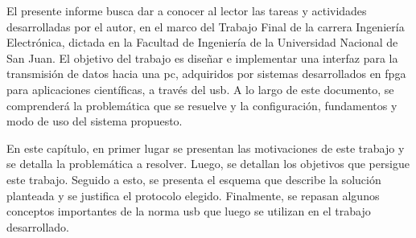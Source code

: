 El presente informe busca dar a conocer al lector las tareas y actividades desarrolladas por el autor, en el marco del Trabajo Final de la carrera Ingeniería Electrónica, dictada en la Facultad de Ingeniería de la Universidad Nacional de San Juan. El objetivo del trabajo es diseñar e implementar una interfaz para la transmisión de datos hacia una \acrfull{pc}, adquiridos por sistemas desarrollados en \acrfull{fpga} para aplicaciones científicas, a través del \acrfull{usb}. A lo largo de este documento, se comprenderá la problemática que se resuelve y la configuración, fundamentos y modo de uso del sistema propuesto.%


En este capítulo, en primer lugar se presentan las motivaciones de este trabajo y se detalla la problemática a resolver. Luego, se detallan los objetivos que persigue este trabajo. Seguido a esto, se presenta el esquema que describe la solución planteada y se justifica el protocolo elegido. Finalmente, se repasan algunos conceptos importantes de la norma \acrshort{usb} que luego se utilizan en el trabajo desarrollado.